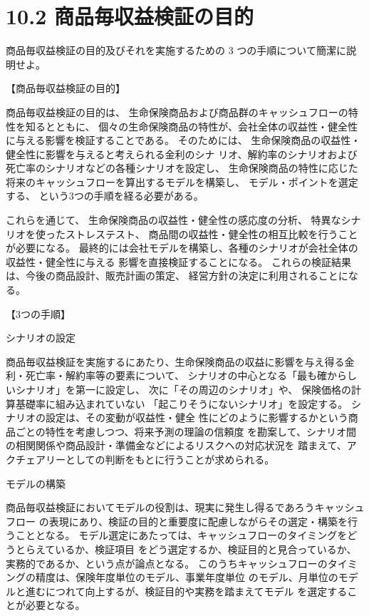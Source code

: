 \documentclass[report,gutter=10mm,fore-edge=10mm,uplatex,dvipdfmx]{jlreq}
\begin{document}
\section{10.2 商品毎収益検証の目的}
商品毎収益検証の目的及びそれを実施するための 3 つの手順について簡潔に説明せよ。

\answer{}

【商品毎収益検証の目的】

商品毎収益検証の目的は、
 生命保険商品および商品群のキャッシュフローの特性を知るとともに、
 個々の生命保険商品の特性が、会社全体の収益性・健全性に与える影響を検証することである。
そのためには、
 生命保険商品の収益性・健全性に影響を与えると考えられる金利のシナ
リオ、解約率のシナリオおよび死亡率のシナリオなどの各種シナリオを設定し、
生命保険商品の特性に応じた将来のキャッシュフローを算出するモデルを構築し、
 モデル・ポイントを選定する、
という3つの手順を経る必要がある。

これらを通じて、
 生命保険商品の収益性・健全性の感応度の分析、
 特異なシナリオを使ったストレステスト、
 商品間の収益性・健全性の相互比較を行うことが必要になる。
 最終的には会社モデルを構築し、各種のシナリオが会社全体の収益性・健全性に与える
影響を直接検証することになる。
これらの検証結果は、今後の商品設計、販売計画の策定、
経営方針の決定に利用されることになる。

【3つの手順】

 シナリオの設定

 商品毎収益検証を実施するにあたり、生命保険商品の収益に影響を与え得る金利・死亡率・解約率等の要素について、
シナリオの中心となる「最も確からしいシナリオ」を第一に設定し、
次に「その周辺のシナリオ」や、
保険価格の計算基礎率に組み込まれていない
「起こりそうにないシナリオ」を設定する。
シナリオの設定は、その変動が収益性・健全
性にどのように影響するかという商品ごとの特性を考慮しつつ、将来予測の理論の信頼度
を勘案して、シナリオ間の相関関係や商品設計・準備金などによるリスクヘの対応状況を
踏まえて、アクチェアリーとしての判断をもとに行うことが求められる。

 モデルの構築

商品毎収益検証においてモデルの役割は、現実に発生し得るであろうキャッシュフロー
の表現にあり、検証の目的と重要度に配慮しながらその選定・構築を行うこととなる。
モデル選定にあたっては、キャッシュフローのタイミングをどうとらえているか、検証項目
をどう選定するか、検証目的と見合っているか、実務的であるか、という点が論点となる。
このうちキャッシュフローのタイミングの精度は、保険年度単位のモデル、事業年度単位
のモデル、月単位のモデルと進むにつれて向上するが、検証目的や実務を踏まえてモデル
を選定することが必要となる。
\end{document}
